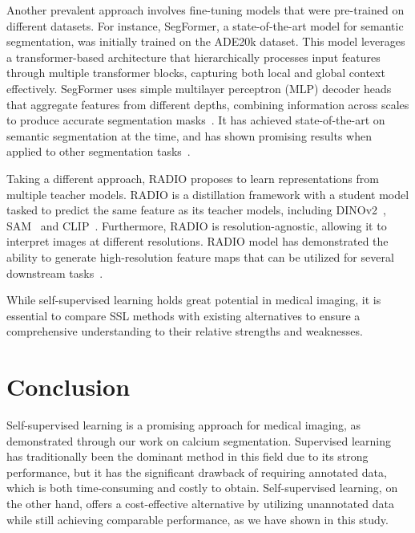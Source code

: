 \documentclass[a4paper,11pt,oneside]{report}
\begin{document}
Another prevalent approach involves fine-tuning models that were pre-trained on different datasets. For instance, SegFormer, a state-of-the-art model for semantic segmentation, was initially trained on the ADE20k dataset. This model leverages a transformer-based architecture that hierarchically processes input features through multiple transformer blocks, capturing both local and global context effectively. SegFormer uses simple multilayer perceptron (MLP) decoder heads that aggregate features from different depths, combining information across scales to produce accurate segmentation masks~\cite{Xie2021SegFormer}. It has achieved state-of-the-art on semantic segmentation at the time, and has shown promising results when applied to other segmentation tasks~\cite{Ghosh2024, Khaled2023}.

Taking a different approach, RADIO proposes to learn representations from multiple teacher models. RADIO is a distillation framework with a student model tasked to predict the same feature as its teacher models, including DINOv2~\cite{Oquab2024dinov}, SAM~\cite{Kirillov2023SAM} and CLIP~\cite{Radford2021CLIP}. Furthermore, RADIO is resolution-agnostic, allowing it to interpret images at different resolutions. RADIO model has demonstrated the ability to generate high-resolution feature maps that can be utilized for several downstream tasks~\cite{Ranzinger2024RADIO}.

While self-supervised learning holds great potential in medical imaging, it is essential to compare SSL methods with existing alternatives to ensure a comprehensive understanding to their relative strengths and weaknesses.

\chapter{Conclusion}

Self-supervised learning is a promising approach for medical imaging, as demonstrated through our work on calcium segmentation. Supervised learning has traditionally been the dominant method in this field due to its strong performance, but it has the significant drawback of requiring annotated data, which is both time-consuming and costly to obtain. Self-supervised learning, on the other hand, offers a cost-effective alternative by utilizing unannotated data while still achieving comparable performance, as we have shown in this study.
\end{document}
